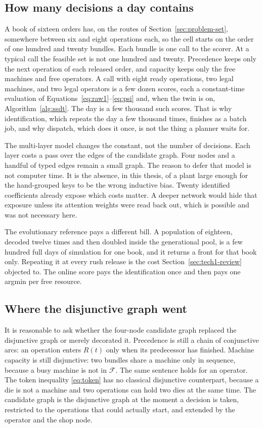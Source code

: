 \subsection{How many decisions a day contains}

A book of sixteen orders has, on the routes of Section~\ref{sec:problem-set}, somewhere between six and eight operations each, so the cell starts on the order of one hundred and twenty bundles. Each bundle is one call to the scorer. At a typical call the feasible set is not one hundred and twenty. Precedence keeps only the next operation of each released order, and capacity keeps only the free machines and free operators. A call with eight ready operations, two legal machines, and two legal operators is a few dozen scores, each a constant-time evaluation of Equations~\eqref{eq:raw1}--\eqref{eq:psi} and, when the twin is on, Algorithm~\ref{alg:ssdt}. The day is a few thousand such scores. That is why identification, which repeats the day a few thousand times, finishes as a batch job, and why dispatch, which does it once, is not the thing a planner waits for.

The multi-layer model changes the constant, not the number of decisions. Each layer costs a pass over the edges of the candidate graph. Four nodes and a handful of typed edges remain a small graph. The reason to defer that model is not computer time. It is the absence, in this thesis, of a plant large enough for the hand-grouped keys to be the wrong inductive bias. Twenty identified coefficients already expose which costs matter. A deeper network would hide that exposure unless its attention weights were read back out, which is possible and was not necessary here.

The evolutionary reference pays a different bill. A population of eighteen, decoded twelve times and then doubled inside the generational pool, is a few hundred full days of simulation for one book, and it returns a front for that book only. Repeating it at every rush release is the cost Section~\ref{sec:tech1-review} objected to. The online score pays the identification once and then pays one argmin per free resource.

\subsection{Where the disjunctive graph went}

It is reasonable to ask whether the four-node candidate graph replaced the disjunctive graph or merely decorated it. Precedence is still a chain of conjunctive arcs: an operation enters \(R(t)\) only when its predecessor has finished. Machine capacity is still disjunctive: two bundles share a machine only in sequence, because a busy machine is not in \(\mathcal{F}\). The same sentence holds for an operator. The token inequality \eqref{eq:token} has no classical disjunctive counterpart, because a die is not a machine and two operations can hold two dies at the same time. The candidate graph is the disjunctive graph at the moment a decision is taken, restricted to the operations that could actually start, and extended by the operator and the shop node.

